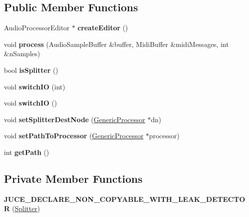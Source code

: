 \subsection*{Public Member Functions}
\begin{DoxyCompactItemize}
\item 
\hypertarget{classSplitter_a1efaec57eeafba93724921f8de2fc296}{Audio\-Processor\-Editor $\ast$ {\bfseries create\-Editor} ()}\label{classSplitter_a1efaec57eeafba93724921f8de2fc296}

\item 
\hypertarget{classSplitter_a0ad1211a06e6a6317d89eb6257d178d3}{void {\bfseries process} (Audio\-Sample\-Buffer \&buffer, Midi\-Buffer \&midi\-Messages, int \&n\-Samples)}\label{classSplitter_a0ad1211a06e6a6317d89eb6257d178d3}

\item 
\hypertarget{classSplitter_ac63efb523b23518f2417b9e983affa31}{bool {\bfseries is\-Splitter} ()}\label{classSplitter_ac63efb523b23518f2417b9e983affa31}

\item 
\hypertarget{classSplitter_a760a6d86203940549bc096e2fa224be3}{void {\bfseries switch\-I\-O} (int)}\label{classSplitter_a760a6d86203940549bc096e2fa224be3}

\item 
\hypertarget{classSplitter_ac1b94259cfe2943f55315dd523f20307}{void {\bfseries switch\-I\-O} ()}\label{classSplitter_ac1b94259cfe2943f55315dd523f20307}

\item 
\hypertarget{classSplitter_ae11524d844f439fc3a101cc7de534c1b}{void {\bfseries set\-Splitter\-Dest\-Node} (\hyperlink{classGenericProcessor}{Generic\-Processor} $\ast$dn)}\label{classSplitter_ae11524d844f439fc3a101cc7de534c1b}

\item 
\hypertarget{classSplitter_a51f9501f7601773bfe5b7f57958f4135}{void {\bfseries set\-Path\-To\-Processor} (\hyperlink{classGenericProcessor}{Generic\-Processor} $\ast$processor)}\label{classSplitter_a51f9501f7601773bfe5b7f57958f4135}

\item 
\hypertarget{classSplitter_a27e4746563139cce811ddd528fe405b8}{int {\bfseries get\-Path} ()}\label{classSplitter_a27e4746563139cce811ddd528fe405b8}

\end{DoxyCompactItemize}
\subsection*{Private Member Functions}
\begin{DoxyCompactItemize}
\item 
\hypertarget{classSplitter_ae2ec58c73fc3c0254422527054e8923b}{{\bfseries J\-U\-C\-E\-\_\-\-D\-E\-C\-L\-A\-R\-E\-\_\-\-N\-O\-N\-\_\-\-C\-O\-P\-Y\-A\-B\-L\-E\-\_\-\-W\-I\-T\-H\-\_\-\-L\-E\-A\-K\-\_\-\-D\-E\-T\-E\-C\-T\-O\-R} (\hyperlink{classSplitter}{Splitter})}\label{classSplitter_ae2ec58c73fc3c0254422527054e8923b}

\end{DoxyCompactItemize}
